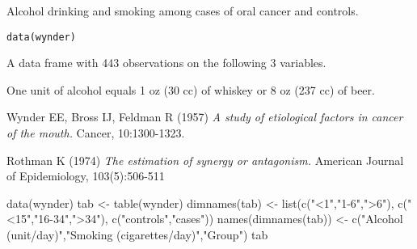 \begin{Description}\relax
Alcohol drinking and smoking among cases of oral cancer and controls.
\end{Description}
\begin{Usage}
\begin{verbatim}data(wynder)\end{verbatim}
\end{Usage}
\begin{Format}\relax
A data frame with 443 observations on the following 3 variables.
\end{Format}
\begin{Details}\relax
One unit of alcohol equals 1 oz (30 cc) of whiskey or 8 oz (237 cc) of beer.
\end{Details}
\begin{Source}\relax
Wynder EE, Bross IJ, Feldman R (1957) \emph{A study of etiological factors in cancer of the mouth.}
Cancer, 10:1300-1323.
\end{Source}
\begin{References}\relax
Rothman K (1974) \emph{The estimation of synergy or antagonism.}
American Journal of Epidemiology, 103(5):506-511
\end{References}
\begin{Examples}
\begin{ExampleCode}
  data(wynder)
  tab <- table(wynder)
  dimnames(tab) <- list(c("<1","1-6",">6"), c("<15","16-34",">34"), c("controls","cases"))  
  names(dimnames(tab)) <- c("Alcohol (unit/day)","Smoking (cigarettes/day)","Group")  
  tab
\end{ExampleCode}
\end{Examples}

